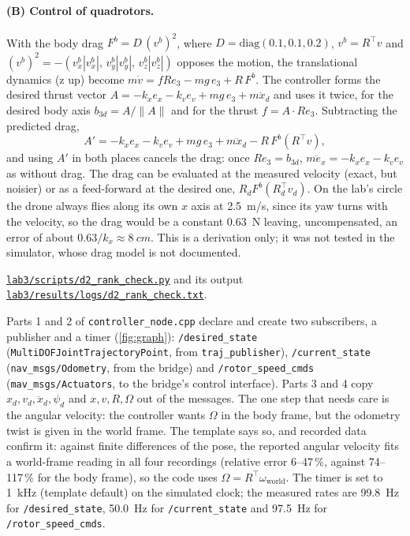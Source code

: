 \documentclass[a4paper]{tufte-handout}
\newcommand{\repo}[1]{\href{https://github.com/Qzz139/LEARN-MIT16.485/blob/main/#1}{\nolinkurl{#1}}}
\begin{document}
\paragraph{(B) Control of quadrotors.}
With the body drag $F^b=D\,(v^b)^2$, where $D=\mathrm{diag}(0.1,0.1,0.2)$,
$v^b=R^\top v$ and $(v^b)^2=-(v^b_x|v^b_x|,\,v^b_y|v^b_y|,\,v^b_z|v^b_z|)$ opposes
the motion, the translational dynamics (z up) become
$m\dot v = fRe_3 - mg\,e_3 + R\,F^b$.
The controller forms the desired thrust vector
$A=-k_x e_x-k_v e_v+mg\,e_3+m\ddot x_d$ and uses it twice, for the desired body
axis $b_{3d}=A/\lVert A\rVert$ and for the thrust $f=A\cdot Re_3$.
Subtracting the predicted drag,
\begin{equation*}
A' = -k_x e_x - k_v e_v + mg\,e_3 + m\ddot x_d - R\,F^b\!\left(R^\top v\right),
\end{equation*}
and using $A'$ in both places cancels the drag: once $Re_3=b_{3d}$,
$m\ddot e_x=-k_x e_x-k_v e_v$ as without drag.
The drag can be evaluated at the measured velocity (exact, but noisier) or as a
feed-forward at the desired one, $R_dF^b(R_d^\top v_d)$.
On the lab's circle the drone always flies along its own $x$ axis at
\SI{2.5}{m/s}, since its yaw turns with the velocity, so the drag would be a
constant \SI{0.63}{N} leaving, uncompensated, an error of about
$0.63/k_x\approx\SI{8}{cm}$. This is a derivation only; it was not tested in the
simulator, whose drag model is not documented.

\begin{evidence}
\repo{lab3/scripts/d2_rank_check.py} and its output
\repo{lab3/results/logs/d2_rank_check.txt}.
\end{evidence}

Parts 1 and 2 of \texttt{controller\_node.cpp} declare and create two subscribers,
a publisher and a timer (\cref{fig:graph}):
\texttt{/desired\_state} (\texttt{MultiDOFJointTrajectoryPoint}, from
\texttt{traj\_publisher}), \texttt{/current\_state} (\texttt{nav\_msgs/Odometry},
from the bridge) and \texttt{/rotor\_speed\_cmds} (\texttt{mav\_msgs/Actuators}, to
the bridge's control interface). Parts 3 and 4 copy $x_d, v_d, \ddot x_d, \psi_d$
and $x, v, R, \Omega$ out of the messages.
The one step that needs care is the angular velocity: the controller wants
$\Omega$ in the body frame, but the odometry twist is given in the world frame.
The template says so, and recorded data confirm it: against finite differences
of the pose, the reported angular velocity fits a world-frame reading in all four
recordings (relative error 6--47\,\%, against 74--117\,\% for the body frame), so
the code uses $\Omega=R^\top\omega_{\text{world}}$.
The timer is set to \SI{1}{kHz} (template default) on the simulated clock; the
measured rates are \SI{99.8}{Hz} for \texttt{/desired\_state}, \SI{50.0}{Hz} for
\texttt{/current\_state} and \SI{97.5}{Hz} for \texttt{/rotor\_speed\_cmds}.
\end{document}
